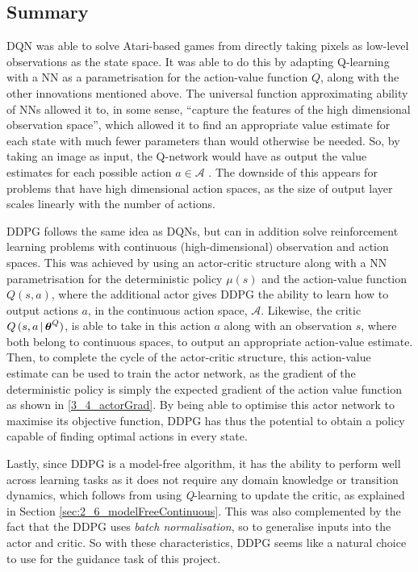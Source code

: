 \subsection{Summary}

DQN \cite{DQN} was able to solve Atari-based games from directly taking pixels as low-level observations as the state space. It was able to do this by adapting Q-learning \cite{watkins1992QLearning} with a NN as a parametrisation for the action-value function $Q$, along with the other innovations mentioned above. The universal function approximating ability of NNs allowed it to, in some sense, ``capture the features of the high dimensional observation space'', which allowed it to find an appropriate value estimate for each state with much fewer parameters than would otherwise be needed. So, by taking an image as input, the Q-network would have as output the value estimates for each possible action $a\in\mathcal{A}$ \cite{DQN}. The downside of this appears for problems that have high dimensional action spaces, as the size of output layer scales linearly with the number of actions.

DDPG follows the same idea as DQNs, but can in addition solve reinforcement learning problems with continuous (high-dimensional) observation and action spaces. 
This was achieved by using an actor-critic structure along with a NN parametrisation for the deterministic policy $\mu(s)$ and the action-value function $Q(s,a)$, where the additional actor gives DDPG the ability to learn how to output actions $a$, in the continuous action space, $\mathcal{A}$. Likewise, the critic $Q\,(s,a \,|\, \boldsymbol{\theta}^Q)$, is able to take in this action $a$ along with an observation $s$, where both belong to continuous spaces, to output an appropriate action-value estimate. Then, to complete the cycle of the actor-critic structure, this action-value estimate can be used to train the actor network, as the gradient of the deterministic policy is simply the expected gradient of the action value function as shown in \eqref{3_4_actorGrad}. By being able to optimise this actor network to maximise its objective function, DDPG has thus the potential to obtain a policy capable of finding optimal actions in every state. 

Lastly, since DDPG is a model-free algorithm, it has the ability to perform well across learning tasks as it does not require any domain knowledge or transition dynamics, which follows from using \textit{Q}-learning to update the critic, as explained in Section \ref{sec:2_6_modelFreeContinuous}. This was also complemented by the fact that the DDPG uses \textit{batch normalisation}, so to generalise inputs into the actor and critic.
So with these characteristics, DDPG seems like a natural choice to use for the guidance task of this project.


